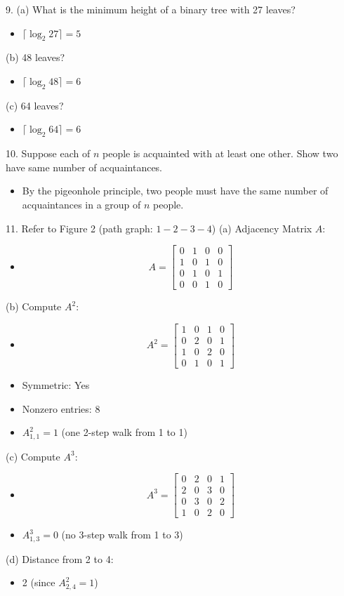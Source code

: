 \documentclass[12pt]{article}
\begin{document}
	9. (a) What is the minimum height of a binary tree with 27 leaves?
	\begin{itemize}
		\item $\lceil \log_2 27 \rceil = 5$
	\end{itemize}
	(b) 48 leaves?
	\begin{itemize}
		\item $\lceil \log_2 48 \rceil = 6$
	\end{itemize}
	(c) 64 leaves?
	\begin{itemize}
		\item $\lceil \log_2 64 \rceil = 6$
	\end{itemize}
	
	10. Suppose each of $n$ people is acquainted with at least one other. Show two have same number of acquaintances.
	\begin{itemize}
		\item By the pigeonhole principle, two people must have the same number of acquaintances in a group of $n$ people.
	\end{itemize}
	
	11. Refer to Figure 2 (path graph: $1 - 2 - 3 - 4$)
	(a) Adjacency Matrix $A$:
	\begin{itemize}
		\item
		\[
		A = \begin{bmatrix}0 & 1 & 0 & 0 \\ 1 & 0 & 1 & 0 \\ 0 & 1 & 0 & 1 \\ 0 & 0 & 1 & 0\end{bmatrix}
		\]
	\end{itemize}
	(b) Compute $A^2$:
	\begin{itemize}
		\item
		\[
		A^2 = \begin{bmatrix}1 & 0 & 1 & 0 \\ 0 & 2 & 0 & 1 \\ 1 & 0 & 2 & 0 \\ 0 & 1 & 0 & 1\end{bmatrix}
		\]
		\item Symmetric: Yes
		\item Nonzero entries: 8
		\item $A^2_{1,1} = 1$ (one 2-step walk from 1 to 1)
	\end{itemize}
	(c) Compute $A^3$:
	\begin{itemize}
		\item
		\[
		A^3 = \begin{bmatrix}0 & 2 & 0 & 1 \\ 2 & 0 & 3 & 0 \\ 0 & 3 & 0 & 2 \\ 1 & 0 & 2 & 0\end{bmatrix}
		\]
		\item $A^3_{1,3} = 0$ (no 3-step walk from 1 to 3)
	\end{itemize}
	(d) Distance from 2 to 4:
	\begin{itemize}
		\item 2 (since $A^2_{2,4} = 1$)
	\end{itemize}
	
\end{document}
